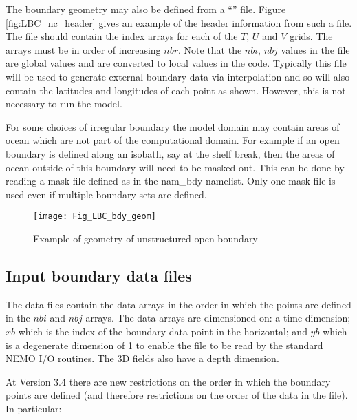\documentclass[../main/NEMO_manual]{subfiles}
\begin{document}
The boundary geometry may also be defined from a ``'' file.
Figure \autoref{fig:LBC_nc_header} gives an example of the header information from such a file.
The file should contain the index arrays for each of the $T$, $U$ and $V$ grids.
The arrays must be in order of increasing $nbr$.
Note that the $nbi$, $nbj$ values in the file are global values and are converted to local values in the code.
Typically this file will be used to generate external boundary data via interpolation and so
will also contain the latitudes and longitudes of each point as shown.
However, this is not necessary to run the model. 

For some choices of irregular boundary the model domain may contain areas of ocean which
are not part of the computational domain.
For example if an open boundary is defined along an isobath, say at the shelf break,
then the areas of ocean outside of this boundary will need to be masked out.
This can be done by reading a mask file defined as  in the nam\_bdy namelist.
Only one mask file is used even if multiple boundary sets are defined.

\begin{figure}[!t]
  \begin{center}
    \texttt{[image: Fig\_LBC\_bdy\_geom]}
    \caption {
      \protect\label{fig:LBC_bdy_geom}
      Example of geometry of unstructured open boundary
    }
  \end{center}
\end{figure}

\subsection{Input boundary data files}
\label{subsec:BDY_data}

The data files contain the data arrays in the order in which the points are defined in the $nbi$ and $nbj$ arrays.
The data arrays are dimensioned on:
a time dimension;
$xb$ which is the index of the boundary data point in the horizontal;
and $yb$ which is a degenerate dimension of 1 to enable the file to be read by the standard NEMO I/O routines.
The 3D fields also have a depth dimension. 

At Version 3.4 there are new restrictions on the order in which the boundary points are defined
(and therefore restrictions on the order of the data in the file).
In particular:
\end{document}
